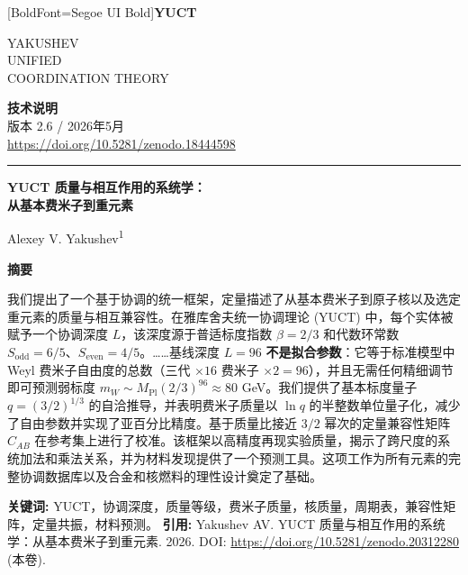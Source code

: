 \documentclass[11pt,a4paper]{article}
\newcommand{\makeheader}{%
	\noindent
	\begin{minipage}{0.17\textwidth}
		\raggedright
		{\fontspec{Segoe UI}[BoldFont=Segoe UI Bold]\bfseries\color{skyblue}\fontsize{46}{46}\selectfont YUCT}%
	\end{minipage}%
	\hspace{30pt}
	\begin{minipage}{0.32\textwidth}
		\raggedright
		{\sffamily\fontsize{11}{13}\selectfont YAKUSHEV\\ UNIFIED\\ COORDINATION THEORY}%
	\end{minipage}%
	\hfill
	\begin{minipage}{0.38\textwidth}
		\raggedleft
		{\sffamily\bfseries 技术说明}\\ 
		{\sffamily 版本 2.6 / 2026年5月}\\ 
		{\sffamily\footnotesize \url{https://doi.org/10.5281/zenodo.18444598}}%
	\end{minipage}
	\par\vspace{5pt}
	\noindent\textcolor{gold}{\rule{\textwidth}{1.6pt}}
	\par\vspace{0pt}
}
\begin{document}
	\thispagestyle{firstpage}
	\makeheader
	
	\vspace{0cm}
	{\LARGE\bfseries YUCT 质量与相互作用的系统学：\\ 
		\Large 从基本费米子到重元素 \par}
	\vspace{0.2cm}
	
	{\large Alexey V. Yakushev\textsuperscript{1}} \\
	\vspace{0.0cm}
	
	{\color{darkblue}\textbf{\LARGE 摘要}} \par
	{\large
		\noindent
		我们提出了一个基于协调的统一框架，定量描述了从基本费米子到原子核以及选定重元素的质量与相互兼容性。在雅库舍夫统一协调理论 (YUCT) 中，每个实体被赋予一个协调深度 \(L\)，该深度源于普适标度指数 \(\beta = 2/3\) 和代数环常数 \(S_{\mathrm{odd}}=6/5\)、\(S_{\mathrm{even}}=4/5\)。……基线深度 \(L=96\) \textbf{不是拟合参数}：它等于标准模型中 Weyl 费米子自由度的总数（三代 $\times 16$ 费米子 $\times 2 = 96$），并且无需任何精细调节即可预测弱标度 \(m_W \sim M_{\mathrm{Pl}}(2/3)^{96} \approx 80\) GeV。我们提供了基本标度量子 \(q = (3/2)^{1/3}\) 的自洽推导，并表明费米子质量以 \(\ln q\) 的半整数单位量子化，减少了自由参数并实现了亚百分比精度。基于质量比接近 \(3/2\) 幂次的定量兼容性矩阵 \(C_{AB}\) 在参考集上进行了校准。该框架以高精度再现实验质量，揭示了跨尺度的系统加法和乘法关系，并为材料发现提供了一个预测工具。这项工作为所有元素的完整协调数据库以及合金和核燃料的理性设计奠定了基础。}
	
	\vspace{0.1cm}
	\noindent
	{\color{darkblue}\textbf{关键词:}} YUCT，协调深度，质量等级，费米子质量，核质量，周期表，兼容性矩阵，定量共振，材料预测。
	\vspace{0.1cm}
	\noindent
	{\color{darkblue}\textbf{引用:}} Yakushev AV. YUCT 质量与相互作用的系统学：从基本费米子到重元素. 2026. DOI: \url{https://doi.org/10.5281/zenodo.20312280} (本卷).
	
	\vspace{0.4cm}
	
\end{document}
